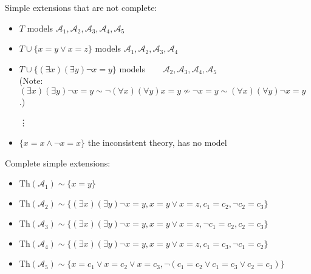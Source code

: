 \begin{problem}
\begin{solution}
\begin{enumerate}[(a)]
            Simple extensions that are not complete:
            \begin{itemize}
                \item $T$ \hfill models $\mathcal A_1,\mathcal A_2,\mathcal A_3,\mathcal A_4,\mathcal A_5$
                \item $T\cup\{x=y\lor x=z\}$ \hfill models $\mathcal A_1,\mathcal A_2,\mathcal A_3,\mathcal A_4\phantom{,\mathcal A_5}$
                \item $T\cup\{(\exists x)(\exists y)\neg x=y\}$ \hfill models $\phantom{\mathcal A_1,}\mathcal A_2,\mathcal A_3,\mathcal A_4,\mathcal A_5$\\
                (Note: $(\exists x)(\exists y)\neg x=y\sim\neg(\forall x)(\forall y)x=y\not\sim\neg x=y\sim(\forall x)(\forall y)\neg x=y$.)
                
                \item[\vdots]
                
                \item $\{x=x\land\neg x=x\}$ \hfill the inconsistent theory, has no model
            \end{itemize}

            Complete simple extensions:
            \begin{itemize}
                \item $\mathrm{Th}(\mathcal A_1)\sim\{x=y\}$
                \item $\mathrm{Th}(\mathcal A_2)\sim\{(\exists x)(\exists y)\neg x=y,x=y\lor x=z,c_1=c_2,\neg c_2=c_3\}$
                \item $\mathrm{Th}(\mathcal A_3)\sim\{(\exists x)(\exists y)\neg x=y,x=y\lor x=z,\neg c_1=c_2,c_2=c_3\}$
                \item $\mathrm{Th}(\mathcal A_4)\sim\{(\exists x)(\exists y)\neg x=y,x=y\lor x=z,c_1=c_3,\neg c_1=c_2\}$
                \item $\mathrm{Th}(\mathcal A_5)\sim\{x=c_1 \vee x=c_2 \vee x=c_3,\neg (c_1=c_2\lor c_1=c_3\lor c_2=c_3)\}$
            \end{itemize}    
            

\end{enumerate}
\end{solution}
\end{problem}
